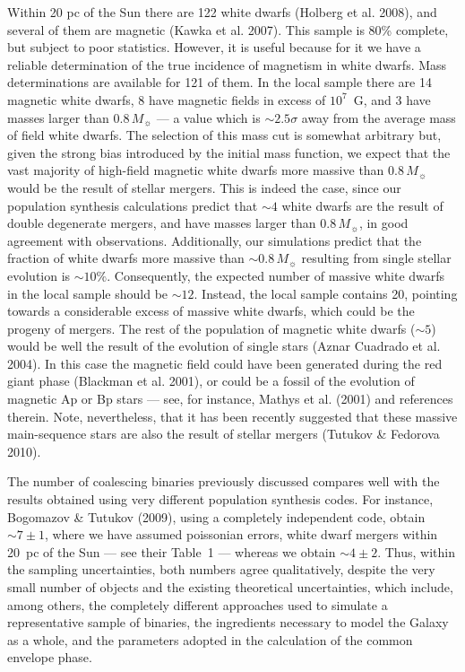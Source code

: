 \documentclass[]{emulateapj}
\begin{document}
Within 20  pc of the  Sun there are  122 white dwarfs (Holberg  et al.
2008), and  several of them are  magnetic (Kawka et  al.  2007).  This
sample is 80\%  complete, but subject to poor  statistics. However, it
is useful because for it we  have a reliable determination of the true
incidence  of  magnetism in  white  dwarfs.   Mass determinations  are
available for 121 of them.  In  the local sample there are 14 magnetic
white dwarfs, 8 have magnetic fields in excess of $10^7$~G, and 3 have
masses  larger  than $0.8\,  M_{\sun}$  ---  a  value which  is  $\sim
2.5\sigma$  away from  the average  mass of  field white  dwarfs.  The
selection of this mass cut is somewhat arbitrary but, given the strong
bias introduced by the initial  mass function, we expect that the vast
majority of high-field magnetic  white dwarfs more massive than $0.8\,
M_{\sun}$ would be the result  of stellar mergers.  This is indeed the
case, since  our population synthesis calculations  predict that $\sim
4$ white dwarfs are the  result of double degenerate mergers, and have
masses  larger   than  $0.8\,   M_{\sun}$,  in  good   agreement  with
observations.  Additionally, our simulations predict that the fraction
of white dwarfs more massive than $\sim 0.8\, M_{\sun}$ resulting from
single stellar  evolution is $\sim 10\%$.   Consequently, the expected
number of  massive white  dwarfs in the  local sample should  be $\sim
12$.   Instead,  the local  sample  contains  20,  pointing towards  a
considerable  excess  of massive  white  dwarfs,  which  could be  the
progeny  of mergers.   The rest  of the  population of  magnetic white
dwarfs ($\sim 5$) would be well  the result of the evolution of single
stars (Aznar Cuadrado  et al.  2004). In this  case the magnetic field
could  have been  generated during  the red  giant phase  (Blackman et
al. 2001), or could be a fossil  of the evolution of magnetic Ap or Bp
stars  --- see,  for instance,  Mathys et  al.  (2001)  and references
therein. Note, nevertheless, that  it has been recently suggested that
these  massive main-sequence  stars  are also  the  result of  stellar
mergers (Tutukov \& Fedorova 2010).

The number  of coalescing binaries previously  discussed compares well
with the  results obtained  using very different  population synthesis
codes. For  instance, Bogomazov \& Tutukov (2009),  using a completely
independent  code,  obtain  $\sim  7\pm  1$,  where  we  have  assumed
poissonian errors, white dwarf mergers within 20~pc of the Sun --- see
their Table~1 ---  whereas we obtain $\sim 4\pm  2$.  Thus, within the
sampling uncertainties, both  numbers agree qualitatively, despite the
very   small  number   of   objects  and   the  existing   theoretical
uncertainties, which  include, among others,  the completely different
approaches used  to simulate a representative sample  of binaries, the
ingredients  necessary  to  model  the  Galaxy as  a  whole,  and  the
parameters adopted in the calculation of the common envelope phase.
\end{document}
